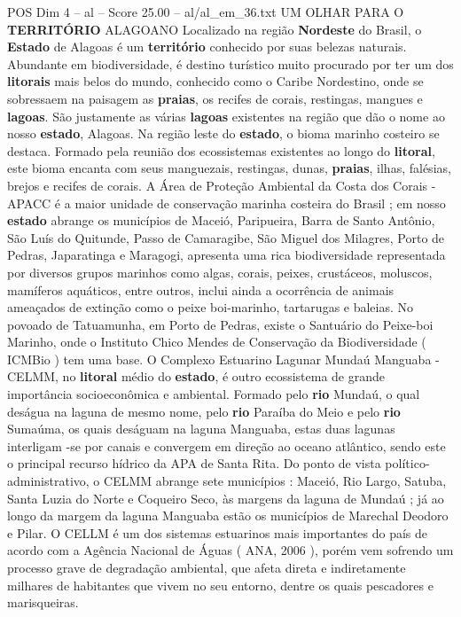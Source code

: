\begin{textsample}{POS Dim 4 – al – Score 25.00 – al/al\_em\_36.txt}  \label{ex:f4_pos_043}
UM OLHAR PARA O \textbf{TERRITÓRIO} ALAGOANO Localizado na região \textbf{Nordeste} do Brasil, o \textbf{Estado} de Alagoas é um \textbf{território} conhecido por suas belezas naturais.
Abundante em biodiversidade, é destino turístico muito procurado por ter um dos \textbf{litorais} mais belos do mundo, conhecido como o Caribe Nordestino, onde se sobressaem na paisagem as \textbf{praias}, os recifes de corais, restingas, mangues e \textbf{lagoas}.
São justamente as várias \textbf{lagoas} existentes na região que dão o nome ao nosso \textbf{estado}, Alagoas.
Na região leste do \textbf{estado}, o bioma marinho costeiro se destaca.
Formado pela reunião dos ecossistemas existentes ao longo do \textbf{litoral}, este bioma encanta com seus manguezais, restingas, dunas, \textbf{praias}, ilhas, falésias, brejos e recifes de corais.
A Área de Proteção Ambiental da Costa dos Corais - APACC é a maior unidade de conservação marinha costeira do Brasil ; em nosso \textbf{estado} abrange os municípios de Maceió, Paripueira, Barra de Santo Antônio, São Luís do Quitunde, Passo de Camaragibe, São Miguel dos Milagres, Porto de Pedras, Japaratinga e Maragogi, apresenta uma rica biodiversidade representada por diversos grupos marinhos como algas, corais, peixes, crustáceos, moluscos, mamíferos aquáticos, entre outros, inclui ainda a ocorrência de animais ameaçados de extinção como o peixe boi-marinho, tartarugas e baleias.
No povoado de Tatuamunha, em Porto de Pedras, existe o Santuário do Peixe-boi Marinho, onde o Instituto Chico Mendes de Conservação da Biodiversidade ( ICMBio ) tem uma base.
O Complexo Estuarino Lagunar Mundaú Manguaba - CELMM, no \textbf{litoral} médio do \textbf{estado}, é outro ecossistema de grande importância socioeconômica e ambiental.
Formado pelo \textbf{rio} Mundaú, o qual deságua na laguna de mesmo nome, pelo \textbf{rio} Paraíba do Meio e pelo \textbf{rio} Sumaúma, os quais deságuam na laguna Manguaba, estas duas lagunas interligam -se por canais e convergem em direção ao oceano atlântico, sendo este o principal recurso hídrico da APA de Santa Rita.
Do ponto de vista político-administrativo, o CELMM abrange sete municípios : Maceió, Rio Largo, Satuba, Santa Luzia do Norte e Coqueiro Seco, às margens da laguna de Mundaú ; já ao longo da margem da laguna Manguaba estão os municípios de Marechal Deodoro e Pilar.
O CELLM é um dos sistemas estuarinos mais importantes do país de acordo com a Agência Nacional de Águas ( ANA, 2006 ), porém vem sofrendo um processo grave de degradação ambiental, que afeta direta e indiretamente milhares de habitantes que vivem no seu entorno, dentre os quais pescadores e marisqueiras.

\end{textsample}
